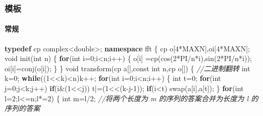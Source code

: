 \documentclass[
]{article}
\newenvironment{Shaded}{}{}
\newcommand{\AttributeTok}[1]{\textcolor[rgb]{0.49,0.56,0.16}{#1}}
\newcommand{\CommentTok}[1]{\textcolor[rgb]{0.38,0.63,0.69}{\textit{#1}}}
\newcommand{\ControlFlowTok}[1]{\textcolor[rgb]{0.00,0.44,0.13}{\textbf{#1}}}
\newcommand{\DataTypeTok}[1]{\textcolor[rgb]{0.56,0.13,0.00}{#1}}
\newcommand{\DecValTok}[1]{\textcolor[rgb]{0.25,0.63,0.44}{#1}}
\newcommand{\KeywordTok}[1]{\textcolor[rgb]{0.00,0.44,0.13}{\textbf{#1}}}
\newcommand{\NormalTok}[1]{#1}
\begin{document}
\hypertarget{ux6a21ux677f-10}{%
\subsubsection{模板}\label{ux6a21ux677f-10}}

\hypertarget{ux5e38ux89c4}{%
\paragraph{常规}\label{ux5e38ux89c4}}

\begin{Shaded}
\begin{Highlighting}[]
\KeywordTok{typedef}\NormalTok{ cp complex\textless{}}\DataTypeTok{double}\NormalTok{\textgreater{};}
\KeywordTok{namespace}\NormalTok{ fft}
\NormalTok{\{}
\NormalTok{    cp o[}\DecValTok{4}\NormalTok{*MAXN],oi[}\DecValTok{4}\NormalTok{*MAXN];}
    \DataTypeTok{void}\NormalTok{ init(}\DataTypeTok{int}\NormalTok{ n)}
\NormalTok{    \{}
        \ControlFlowTok{for}\NormalTok{(}\DataTypeTok{int}\NormalTok{ i=}\DecValTok{0}\NormalTok{;i\textless{}n;i++)}
\NormalTok{        \{}
\NormalTok{            o[i] =cp(cos(}\DecValTok{2}\NormalTok{*PI/n*i),sin(}\DecValTok{2}\NormalTok{*PI/n*i));}
\NormalTok{            oi[i]=conj(o[i]);}
\NormalTok{        \}}
\NormalTok{    \}}
    \DataTypeTok{void}\NormalTok{ transform(cp a[],}\AttributeTok{const} \DataTypeTok{int}\NormalTok{ n,cp o[])}
\NormalTok{    \{}
        \CommentTok{//二进制翻转}
        \DataTypeTok{int}\NormalTok{ k=}\DecValTok{0}\NormalTok{;}
        \ControlFlowTok{while}\NormalTok{((}\DecValTok{1}\NormalTok{\textless{}\textless{}k)\textless{}n)k++;}
        \ControlFlowTok{for}\NormalTok{(}\DataTypeTok{int}\NormalTok{ i=}\DecValTok{0}\NormalTok{;i\textless{}n;i++)}
\NormalTok{        \{}
            \DataTypeTok{int}\NormalTok{ t=}\DecValTok{0}\NormalTok{;}
            \ControlFlowTok{for}\NormalTok{(}\DataTypeTok{int}\NormalTok{ j=}\DecValTok{0}\NormalTok{;j\textless{}k;j++)}
                \ControlFlowTok{if}\NormalTok{(i\&(}\DecValTok{1}\NormalTok{\textless{}\textless{}j))}
\NormalTok{                    t|=(}\DecValTok{1}\NormalTok{\textless{}\textless{}(k{-}j{-}}\DecValTok{1}\NormalTok{));}
            \ControlFlowTok{if}\NormalTok{(i\textless{}t) swap(a[i],a[t]);}
\NormalTok{        \}}
        \ControlFlowTok{for}\NormalTok{(}\DataTypeTok{int}\NormalTok{ l=}\DecValTok{2}\NormalTok{;l\textless{}=n;l*=}\DecValTok{2}\NormalTok{)}
\NormalTok{        \{}
            \DataTypeTok{int}\NormalTok{ m=l/}\DecValTok{2}\NormalTok{;}
            \CommentTok{//将两个长度为 m 的序列的答案合并为长度为 l 的序列的答案}

\end{Highlighting}
\end{Shaded}
\end{document}
